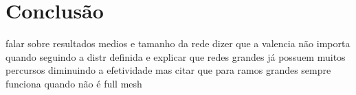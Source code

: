 \chapter{Conclusão}
falar sobre resultados medios e tamanho da rede dizer que a valencia não importa quando seguindo a distr definida e explicar que redes grandes já possuem muitos percursos diminuindo a efetividade mas citar que para ramos grandes sempre funciona quando não é full mesh


